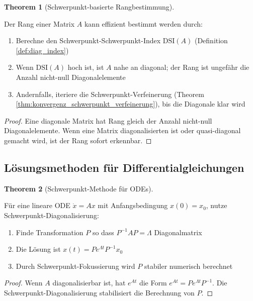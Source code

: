 \documentclass[a4paper,12pt]{article}
\theoremstyle{definition}
\newtheorem{theorem}{Theorem}
\begin{document}
\begin{theorem}[Schwerpunkt-basierte Rangbestimmung]
\label{thm:schwerpunkt_rang}

Der Rang einer Matrix $A$ kann effizient bestimmt werden durch:

\begin{enumerate}
\item Berechne den Schwerpunkt-Schwerpunkt-Index $\text{DSI}(A)$ (Definition \ref{def:diag_index})
\item Wenn $\text{DSI}(A)$ hoch ist, ist $A$ nahe an diagonal; der Rang ist ungefähr die Anzahl nicht-null Diagonalelemente
\item Andernfalls, iteriere die Schwerpunkt-Verfeinerung (Theorem \ref{thm:konvergenz_schwerpunkt_verfeinerung}), bis die Diagonale klar wird
\end{enumerate}

\begin{proof}
Eine diagonale Matrix hat Rang gleich der Anzahl nicht-null Diagonalelemente. Wenn eine Matrix diagonalisierten ist oder quasi-diagonal gemacht wird, ist der Rang sofort erkennbar.
\end{proof}
\end{theorem}

\subsection{Lösungsmethoden für Differentialgleichungen}

\begin{theorem}[Schwerpunkt-Methode für ODEs]
\label{thm:schwerpunkt_ode}

Für eine lineare ODE $\dot{x} = Ax$ mit Anfangsbedingung $x(0) = x_0$, nutze Schwerpunkt-Diagonalisierung:

\begin{enumerate}
\item Finde Transformation $P$ so dass $P^{-1} A P = \Lambda$ Diagonalmatrix
\item Die Lösung ist $x(t) = P e^{\Lambda t} P^{-1} x_0$
\item Durch Schwerpunkt-Fokussierung wird $P$ stabiler numerisch berechnet
\end{enumerate}

\begin{proof}
Wenn $A$ diagonalisierbar ist, hat $e^{At}$ die Form $e^{At} = P e^{\Lambda t} P^{-1}$. Die Schwerpunkt-Diagonalisierung stabilisiert die Berechnung von $P$.
\end{proof}
\end{theorem}
\end{document}
